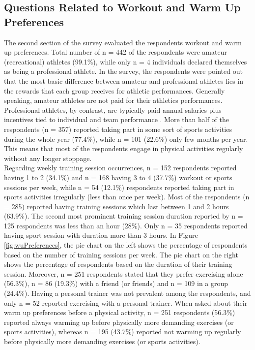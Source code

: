 \subsection{Questions Related to Workout and Warm Up Preferences}
The second section of the survey evaluated the respondents workout and warm up preferences. Total number of n = 442 of the respondents were amateur (recreational) athletes (99.1\%), while only n = 4 individuals declared themselves as being a professional athlete. In the survey, the respondents were pointed out that the most basic difference between amateur and professional athletes lies in the rewards that each group receives for athletic performances. Generally speaking, amateur athletes are not paid for their athletics performances. Professional athletes, by contrast, are typically paid annual salaries plus incentives tied to individual and team performance \cite{amateurvsproffesional}. More than half of the respondents (n = 357) reported taking part in some sort of sports activities during the whole year (77.4\%), while n = 101 (22.6\%) only few months per year. This means that most of the respondents engage in physical activities regularly without any longer stoppage. \\Regarding weekly training session occurrences, n = 152 respondents reported having 1 to 2 (34.1\%) and n = 168 having 3 to 4 (37.7\%) workout or sports sessions per week, while n = 54 (12.1\%) respondents reported taking part in sports activities irregularly (less than once per week). Most of the respondents (n = 285) reported having training sessions which last between 1 and 2 hours (63.9\%). The second most prominent training session duration reported by n = 125 respondents was less than an hour (28\%). Only n = 35 respondents reported having sport session with duration more than 3 hours. In Figure \ref{fig:wuPreferences}, the pie chart on the left shows the percentage of respondents based on the number of training sessions per week. The pie chart on the right shows the percentage of respondents based on the duration of their training session. Moreover, n = 251 respondents stated that they prefer exercising alone (56.3\%), n = 86 (19.3\%) with a friend (or friends) and n = 109 in a group (24.4\%). Having a personal trainer was not prevalent among the respondents, and only n = 52 reported exercising with a personal trainer. When asked about their warm up preferences before a physical activity, n = 251 respondents (56.3\%) reported always warming up before physically more demanding exercises (or sports activities), whereas n = 195 (43.7\%) reported not warming up regularly before physically more demanding exercises (or sports activities).  \\

